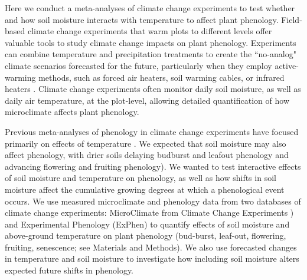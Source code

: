 \documentclass{article}
\begin{document}
\par Here we conduct a meta-analyses of climate change experiments to test whether and how soil moisture interacts with temperature to affect plant phenology. Field-based climate change experiments that warm plots to different levels offer valuable tools to study climate change impacts on plant phenology. Experiments can combine temperature and precipitation treatments to create the ``no-analog" climate scenarios forecasted for the future, particularly when they employ active-warming methods, such as forced air heaters, soil warming cables, or infrared heaters \citep{shaver2000,williams2007b,aronson2009}. Climate change experiments often monitor daily soil moisture, as well as daily air temperature, at the plot-level, allowing detailed quantification of how microclimate affects plant phenology. 
\par Previous meta-analyses of phenology in climate change experiments have focused primarily on effects of temperature \citep[e.g.,][]{wolkovich2012}. We expected that soil moisture may also affect phenology, with drier soils delaying budburst and leafout phenology and advancing flowering and fruiting phenology). We wanted to test interactive effects of soil moisture and temperature on phenology, as well as how shifts in soil moisture affect the cumulative growing degrees at which a phenological event occurs.   We use measured microclimate and phenology data from two databases of climate change experiments: MicroClimate from Climate Change Experiments \citep[MC3E, ][]{ettinger2018}) and Experimental Phenology (ExPhen)  to quantify effects of soil moisture and above-ground temperature on plant phenology (bud-burst, leaf-out, flowering, fruiting, senescence; see Materials and Methods). We also use forecasted changes in temperature and soil moisture to investigate how including soil moisture alters expected future shifts in phenology. 
\end{document}
